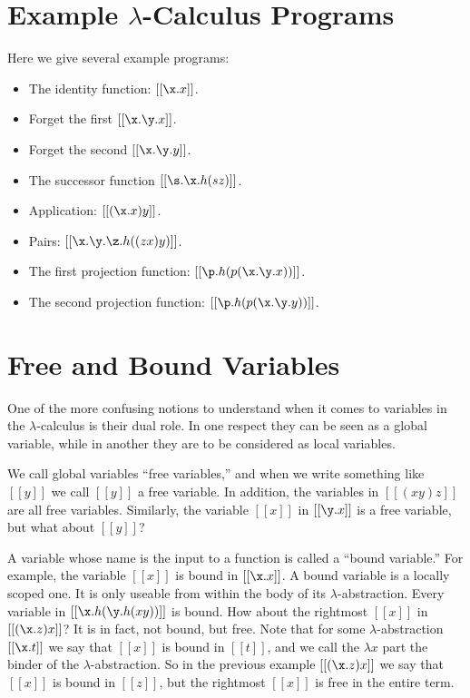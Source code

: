 \documentclass{article}
\begin{document}
\section{Example $\lambda$-Calculus Programs}
\label{sec:example_lambda-calculus_programs}
Here we give several example programs:
\begin{itemize}
\item The identity function: $[[\x.x]]$.
\item Forget the first $[[\x.\y.x]]$.
\item Forget the second $[[\x.\y.y]]$.
\item The successor function $[[\s.\x.h(s z)]]$.
\item Application: $[[(\x.x) y]]$.
\item Pairs: $[[\x.\y.\z.h((z x) y)]]$.
\item The first projection function: $[[\p.h(p (\x.\y.x))]]$.
\item The second projection function: $[[\p.h(p (\x.\y.y))]]$.
\end{itemize}

\section{Free and Bound Variables}
\label{sec:free-bound}

One of the more confusing notions to understand when it comes to
variables in the $\lambda$-calculus is their dual role.  In one
respect they can be seen as a global variable, while in another they
are to be considered as local variables.  

We call global variables ``free variables,'' and when we write
something like $[[y]]$ we call $[[y]]$ a free variable.  In addition,
the variables in $[[(x y) z]]$ are all free variables.  Similarly, the
variable $[[x]]$ in $[[\y.x]]$ is a free variable, but what about
$[[y]]$?

A variable whose name is the input to a function is called a ``bound
variable.''  For example, the variable $[[x]]$ is bound in $[[\x.x]]$.
A bound variable is a locally scoped one.  It is only useable from
within the body of its $\lambda$-abstraction.  Every variable in
$[[\x.h(\y.h(x y))]]$ is bound.  How about the rightmost $[[x]]$ in
$[[(\x.z) x]]$?  It is in fact, not bound, but free.  Note that for
some $\lambda$-abstraction $[[\x.t]]$ we say that $[[x]]$ is bound in
$[[t]]$, and we call the $\lambda x$ part the binder of the
$\lambda$-abstraction.  So in the previous example $[[(\x.z) x]]$ we
say that $[[x]]$ is bound in $[[z]]$, but the rightmost $[[x]]$ is
free in the entire term.
\end{document}
